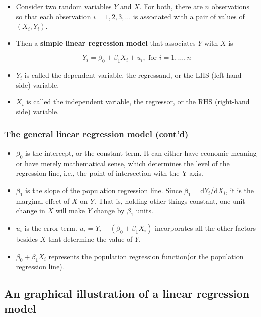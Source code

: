 \documentclass[11pt]{article}
\begin{document}
\begin{itemize}
\item Consider two random variables \(Y\) and \(X\). For both, there are \(n\) observations so that
each observation \(i = 1, 2, 3, \ldots\) is associated with a pair of
values of \((X_i, Y_i)\).

\item Then a \textbf{simple linear regression model} that associates \(Y\) with \(X\) is

\begin{equation}
\label{eq:single-regress}
Y_i = \beta_0 + \beta_1 X_i + u_i, \text{ for } i = 1, \ldots, n
\end{equation}

\item \(Y_i\) is called the dependent variable, the regressand, or the LHS
(left-hand side) variable.
\item \(X_i\) is called the independent variable, the regressor, or the RHS
(right-hand side) variable.
\end{itemize}

\subsubsection*{The general linear regression model (cont'd)}
\label{sec:orgb520e2d}

\begin{itemize}
\item \(\beta_{0}\) is the intercept, or the constant term. It can either have
economic meaning or have merely mathematical sense, which determines
the level of the regression line, i.e., the point of intersection
with the Y axis.
\item \(\beta_{1}\) is the slope of the population regression line. Since
\(\beta_1 = \mathrm{d}Y_i/ \mathrm{d}X_i\), it is the marginal effect
of \(X\) on \(Y\). That is, holding other things constant, one unit
change in \(X\) will make \(Y\) change by \(\beta_1\) units.
\item \(u_i\) is the error term. \(u_i = Y_i - (\beta_0 + \beta_1 X_i)\)
incorporates all the other factors besides \(X\) that determine the
value of \(Y\).
\item \(\beta_{0} + \beta_{1}X_{i}\) represents the population regression
function(or the population regression line).
\end{itemize}

\subsection*{An graphical illustration of a linear regression model}
\label{sec:org27aecdb}
\end{document}

